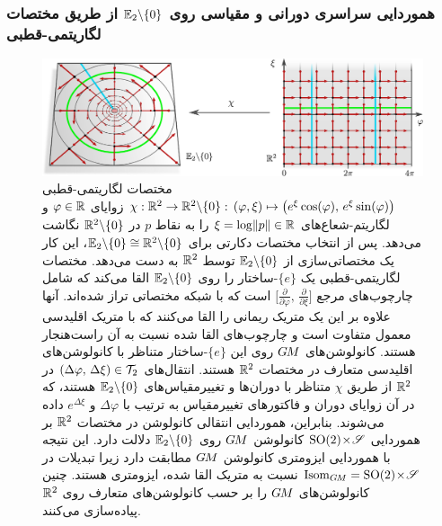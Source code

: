 
\subsubsection*{هموردایی سراسری دورانی و مقیاسی روی $\mathbb{E}_2 \backslash \{0\}$ از طریق مختصات لگاریتمی-قطبی}
\label{sec:polar_Euc2_logpolar}

\begin{figure}
	\centering
	\includegraphics[width=.94\textwidth]{figures/G_structure_R2_no_origin_logpolar_coords.pdf}
	\vspace*{2ex}
	\caption{\small
		مختصات لگاریتمی-قطبی 
		$\chi: \mathbb{R}^2 \to \mathbb{R}^2 \backslash \{0\} :\, (\varphi,\xi) \mapsto \big( e^{\xi}\cos(\varphi) ,\, e^{\xi}\sin(\varphi) \big)$
		زوایای $\varphi \in \mathbb{R}$ و لگاریتم-شعاع‌های $\xi = \log\lVert p\rVert \in \mathbb{R}$ را به نقاط $p$ در $\mathbb{R}^2 \backslash \{0\}$ نگاشت می‌دهد.
		پس از انتخاب مختصات دکارتی برای $\mathbb{E}_2 \backslash \{0\} \cong \mathbb{R}^2 \backslash \{0\}$، این کار یک مختصاتی‌سازی از $\mathbb{E}_2 \backslash \{0\}$ توسط $\mathbb{R}^2$ به دست می‌دهد.
		مختصات لگاریتمی-قطبی یک $\{e\}$-ساختار را روی $\mathbb{E}_2 \backslash \{0\}$ القا می‌کند که شامل چارچوب‌های مرجع
		$\big[ \frac{\partial}{\partial \varphi} ,\, \frac{\partial}{\partial \xi} \big]$ است که با شبکه مختصاتی تراز شده‌اند.
		آنها علاوه بر این یک متریک ریمانی را القا می‌کنند که با متریک اقلیدسی معمول متفاوت است و چارچوب‌های القا شده نسبت به آن راست‌هنجار هستند.
		کانولوشن‌های $G\mkern-1.4muM$ روی این $\{e\}$-ساختار متناظر با کانولوشن‌های اقلیدسی متعارف در مختصات $\mathbb{R}^2$ هستند.
		انتقال‌های $(\Delta\varphi,\, \Delta\xi) \in \mathcal{T}_2$ در $\mathbb{R}^2$ از طریق $\chi$ متناظر با دوران‌ها و تغییرمقیاس‌های $\mathbb{E}_2 \backslash \{0\}$ هستند، که در آن زوایای دوران و فاکتورهای تغییرمقیاس به ترتیب با $\Delta\varphi$ و $e^{\Delta\xi}$ داده می‌شوند.
		بنابراین، هموردایی انتقالی کانولوشن در مختصات $\mathbb{R}^2$ بر هموردایی ${\operatorname{SO}(2) \!\times\! \mathscr{S}}$ کانولوشن $G\mkern-1.4muM$ روی $\mathbb{E}_2 \backslash \{0\}$ دلالت دارد.
		این نتیجه با هموردایی ایزومتری کانولوشن $G\mkern-1.4muM$ مطابقت دارد زیرا تبدیلات در $\operatorname{Isom}_{G\mkern-1.4muM} = {\operatorname{SO}(2) \!\times\! \mathscr{S}}$ نسبت به متریک القا شده، ایزومتری هستند.
		\citet{esteves2017polar} چنین کانولوشن‌های $G\mkern-1.4muM$ را بر حسب کانولوشن‌های متعارف روی $\mathbb{R}^2$ پیاده‌سازی می‌کنند.
	}
	\label{fig:G_structure_R2_no_origin_logpolar}
\end{figure}

